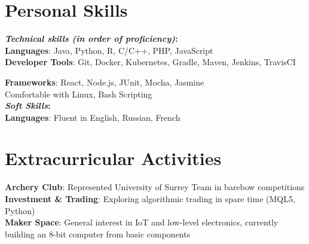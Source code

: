 \documentclass[letterpaper,11pt]{article}
\begin{document}
\section{Personal Skills}
\vspace*{-0.5 cm}
\begin{multicols}{2}
 \begin{itemize}[leftmargin=0.15in, label={}]
    \small{\item{
     \textbf{\emph{Technical skills (in order of proficiency)}{:}} \\
     \textbf{Languages}{: Java, Python, R, C/C++, PHP, JavaScript} \\
     \textbf{Developer Tools}{: Git, Docker, Kubernetes, Gradle, Maven, Jenkins, TravisCI} \\
    }}
 \end{itemize}
 
 \columnbreak
 \begin{itemize}[leftmargin=0.15in, label={}]
    \small{\item{
     \textbf{Frameworks}{: React, Node.js, JUnit, Mocha, Jasmine} \\
     Comfortable with Linux, Bash Scripting \\
     \textbf{\emph{Soft Skills}{:}} \\
     \textbf{Languages}{: Fluent in English, Russian, French} \\
    }}
 \end{itemize}
\end{multicols}

\section{Extracurricular Activities}
 \begin{itemize}[leftmargin=0.15in, label={}]
    \small{\item{
     \textbf{Archery Club}{: Represented University of Surrey Team in barebow competitions} \\
     \textbf{Investment \& Trading}{: Exploring algorithmic trading in spare time (MQL5, Python)} \\
     \textbf{Maker Space}{: General interest in IoT and low-level electronics, currently building an 8-bit computer from basic components} \\
    }}
 \end{itemize}
\end{document}
